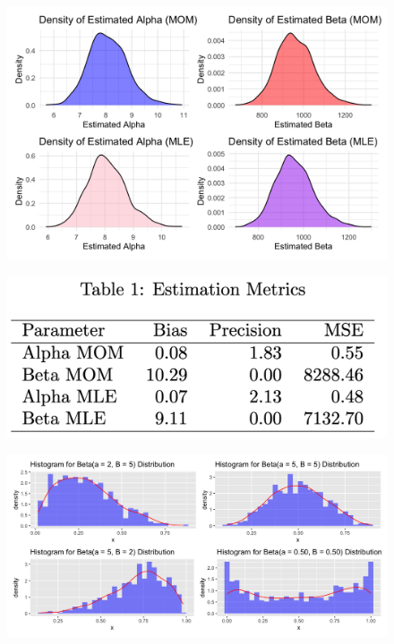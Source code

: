 \documentclass{article}\usepackage[]{graphicx}\usepackage[]{xcolor}
\begin{document}
\begin{figure}[!htbp]
    \centering
    \includegraphics[width=.75\textwidth]{Rplot08.png}
    \caption{}
    \label{fig:second}
\end{figure}

\begin{figure}[!t]
    \vspace{-1in} %
    \centering
    \includegraphics[width=.75\textwidth]{Table}
    \caption{}
    \label{fig:third}
\end{figure}

\begin{figure}[!htbp]
    \vspace{-4in}
    \centering
    \includegraphics[width=.75\textwidth]{HHHH}
    \caption{}
    \label{fig:fourth}
\end{figure}
\end{document}

